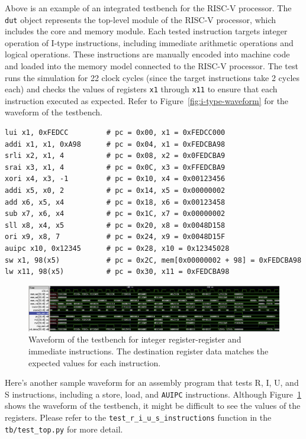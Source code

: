 Above is an example of an integrated testbench for the RISC-V processor.
The \texttt{dut} object represents the top-level module of the RISC-V processor, which includes the core and memory module.
Each tested instruction targets integer operation of I-type instructions, including immediate arithmetic operations and logical operations.
These instructions are manually encoded into machine code and loaded into the memory model connected to the RISC-V processor.
The test runs the simulation for 22 clock cycles (since the target instructions take 2 cycles each) and checks the values of registers \texttt{x1} through \texttt{x11} to ensure that each instruction executed as expected.
Refer to Figure~\ref{fig:i-type-waveform} for the waveform of the testbench.

\begin{verbatim}
lui x1, 0xFEDCC         # pc = 0x00, x1 = 0xFEDCC000
addi x1, x1, 0xA98      # pc = 0x04, x1 = 0xFEDCBA98
srli x2, x1, 4          # pc = 0x08, x2 = 0x0FEDCBA9
srai x3, x1, 4          # pc = 0x0C, x3 = 0xFFEDCBA9
xori x4, x3, -1         # pc = 0x10, x4 = 0x00123456
addi x5, x0, 2          # pc = 0x14, x5 = 0x00000002
add x6, x5, x4          # pc = 0x18, x6 = 0x00123458
sub x7, x6, x4          # pc = 0x1C, x7 = 0x00000002
sll x8, x4, x5          # pc = 0x20, x8 = 0x0048D158
ori x9, x8, 7           # pc = 0x24, x9 = 0x0048D15F
auipc x10, 0x12345      # pc = 0x28, x10 = 0x12345028
sw x1, 98(x5)           # pc = 0x2C, mem[0x00000002 + 98] = 0xFEDCBA98
lw x11, 98(x5)          # pc = 0x30, x11 = 0xFEDCBA98
\end{verbatim}

\begin{figure}[H]
    \centering
    \includegraphics[width=\textwidth]{media/r_i_u_s_type_waveform}
    \caption{Waveform of the testbench for integer register-register and immediate instructions. The destination register data matches the expected values for each instruction.}
    \label{fig:r_i_u_s_type_waveform}
\end{figure}

Here's another sample waveform for an assembly program that tests R, I, U, and S instructions, including a store, load, and \texttt{AUIPC} instructions.
Although Figure~\ref{fig:r_i_u_s_type_waveform} shows the waveform of the testbench, it might be difficult to see the values of the registers.
Please refer to the \texttt{test\_r\_i\_u\_s\_instructions} function in the \texttt{tb/test\_top.py} for more detail.

